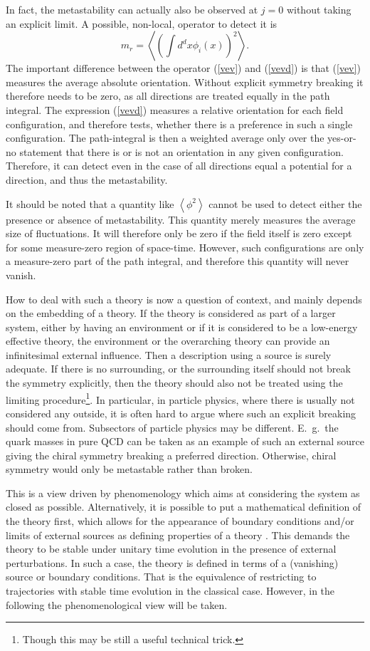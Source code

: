 \documentclass[final,12pt,3p,longtitle]{elsarticle}
\newcommand*{\no}{\noindent}
\newcommand*{\be}{\begin{equation}}
\newcommand*{\ee}{\end{equation}}
\newcommand*{\pref}[1]{(\ref{#1})}
\newcommand*{\1}{1\!\!\!\bot}
\newcommand*{\la}{\left\langle}
\newcommand*{\ra}{\right\rangle}
\begin{document}
In fact, the metastability can actually also be observed at $j=0$ without taking an explicit limit. A possible, non-local, operator to detect it is \cite{Langfeld:2002ic,Caudy:2007sf}
\be
m_r=\left\langle\left(\int d^dx\phi_i(x)\right)^2\right\rangle\label{vevd}.
\ee
\no The important difference between the operator \pref{vev} and \pref{vevd} is that \pref{vev} measures the average absolute orientation. Without explicit symmetry breaking it therefore needs to be zero, as all directions are treated equally in the path integral. The expression \pref{vevd} measures a relative orientation for each field configuration, and therefore tests, whether there is a preference in such a single configuration. The path-integral is then a weighted average only over the yes-or-no statement that there is or is not an orientation in any given configuration. Therefore, it can detect even in the case of all directions equal a potential for a direction, and thus the metastability.

It should be noted that a quantity like $\la\phi^2\ra$ cannot be used to detect either the presence or absence of metastability. This quantity merely measures the average size of fluctuations. It will therefore only be zero if the field itself is zero except for some measure-zero region of space-time. However, such configurations are only a measure-zero part of the path integral, and therefore this quantity will never vanish.

How to deal with such a theory is now a question of context, and mainly depends on the embedding of a theory. If the theory is considered as part of a larger system, either by having an environment or if it is considered to be a low-energy effective theory, the environment or the overarching theory can provide an infinitesimal external influence. Then a description using a source is surely adequate. If there is no surrounding, or the surrounding itself should not break the symmetry explicitly, then the theory should also not be treated using the limiting procedure\footnote{Though this may be still a useful technical trick.}. In particular, in particle physics, where there is usually not considered any outside, it is often hard to argue where such an explicit breaking should come from. Subsectors of particle physics may be different. E.\ g.\ the quark masses in pure QCD can be taken as an example of such an external source giving the chiral symmetry breaking a preferred direction. Otherwise, chiral symmetry would only be metastable rather than broken.

This is a view driven by phenomenology which aims at considering the system as closed as possible. Alternatively, it is possible to put a mathematical definition of the theory first, which allows for the appearance of boundary conditions and/or limits of external sources as defining properties of a theory \cite{Strocchi:2005yk,Frohlich:1976it}. This demands the theory to be stable under unitary time evolution in the presence of external perturbations. In such a case, the theory is defined in terms of a (vanishing) source or boundary conditions. That is the equivalence of restricting to trajectories with stable time evolution in the classical case. However, in the following the phenomenological view will be taken.
\end{document}
